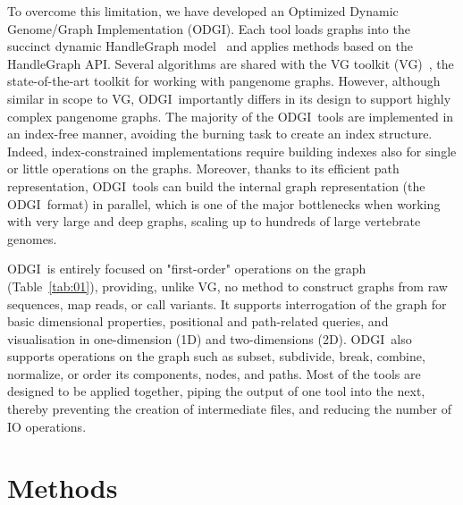 \documentclass{bioinfo}
\newcommand{\odgi}{ODGI}
\begin{document}
    To overcome this limitation, we have developed an Optimized Dynamic Genome/Graph Implementation (ODGI). Each tool
    loads graphs into the succinct dynamic HandleGraph model~\citep{33040146} and applies methods based on the
    HandleGraph API. Several algorithms are shared with the VG toolkit (VG)~\citep{30125266}, the state-of-the-art
    toolkit for working with pangenome graphs. However, although similar in scope to VG, \odgi\ importantly differs in
    its design to support highly complex pangenome graphs. The majority of the \odgi\ tools are implemented in an
    index-free manner, avoiding the burning task to create an index structure. Indeed, index-constrained
    implementations require building indexes also for single or little operations on the graphs. Moreover,
    thanks to its efficient path representation, \odgi\ tools can build the internal graph representation (the \odgi\
    format) in parallel, which is one of the major bottlenecks when working with very large and deep graphs,
    scaling up to hundreds of large vertebrate genomes.


    \odgi\ is entirely focused on "first-order" operations on the graph
    (Table~\ref{tab:01}), providing, unlike VG, no method to construct
    graphs from raw sequences, map reads, or call variants. It
    supports interrogation of the graph for basic dimensional
    properties, positional and path-related queries, and visualisation
    in one-dimension (1D) and two-dimensions (2D). \odgi\ also supports
    operations on the graph such as subset, subdivide, break, combine,
    normalize, or order its components, nodes, and paths. Most of the
    tools are designed to be applied together, piping the output of
    one tool into the next, thereby preventing the creation of
    intermediate files, and reducing the number of IO operations.

    \section{Methods}
\end{document}
